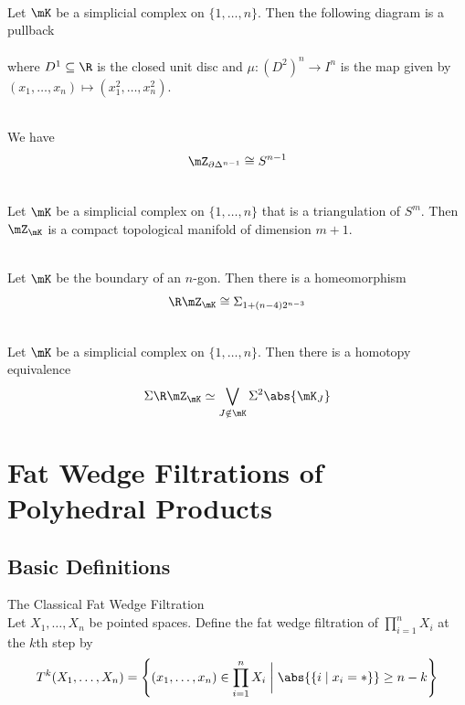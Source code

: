 \documentclass[a4paper]{article}
\begin{document}
\begin{prp}{}{}\\
Let $\mK$ be a simplicial complex on $\{1,\dots,n\}$. Then the following diagram is a pullback \\
\\
where $D^1\subseteq\R$ is the closed unit disc and $\mu:(D^2)^n\to I^n$ is the map given by $(x_1,\dots,x_n)\mapsto(x_1^2,\dots,x_n^2)$. 
\end{prp}

\begin{eg}{}{}\\
We have $$\mZ_{\partial\Delta^{n-1}}\cong S^{n-1}$$
\end{eg}

\begin{prp}{}{}\\
Let $\mK$ be a simplicial complex on $\{1,\dots,n\}$ that is a triangulation of $S^m$. Then $\mZ_\mK$ is a compact topological manifold of dimension $m+1$. 
\end{prp}

\begin{eg}{}{}\\
Let $\mK$ be the boundary of an $n$-gon. Then there is a homeomorphism $$\R\mZ_\mK\cong\Sigma_{1+(n-4)2^{n-3}}$$
\end{eg}

\begin{crl}{}{}\\
Let $\mK$ be a simplicial complex on $\{1,\dots,n\}$. Then there is a homotopy equivalence $$\Sigma\R\mZ_\mK\simeq\bigvee_{J\notin\mK}\Sigma^2\abs{\mK_J}$$
\end{crl}

\pagebreak
\section{Fat Wedge Filtrations of Polyhedral Products}
\subsection{Basic Definitions}
\begin{defn}{The Classical Fat Wedge Filtration}{}\\
Let $X_1,\dots,X_n$ be pointed spaces. Define the fat wedge filtration of $\prod_{i=1}^nX_i$ at the $k$th step by $$T^k(X_1,\dots,X_n)=\left\{(x_1,\dots,x_n)\in\prod_{i=1}^nX_i\;\bigg{|}\;\abs{\{i\;|\;x_i=\ast\}}\geq n-k\right\}$$
\end{defn}
\end{document}
